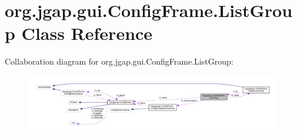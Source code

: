 \hypertarget{classorg_1_1jgap_1_1gui_1_1_config_frame_1_1_list_group}{\section{org.\-jgap.\-gui.\-Config\-Frame.\-List\-Group Class Reference}
\label{classorg_1_1jgap_1_1gui_1_1_config_frame_1_1_list_group}
}


Collaboration diagram for org.\-jgap.\-gui.\-Config\-Frame.\-List\-Group\-:
\nopagebreak
\begin{figure}[H]
\begin{center}
\leavevmode
\includegraphics[width=350pt]{classorg_1_1jgap_1_1gui_1_1_config_frame_1_1_list_group__coll__graph}
\end{center}
\end{figure}
